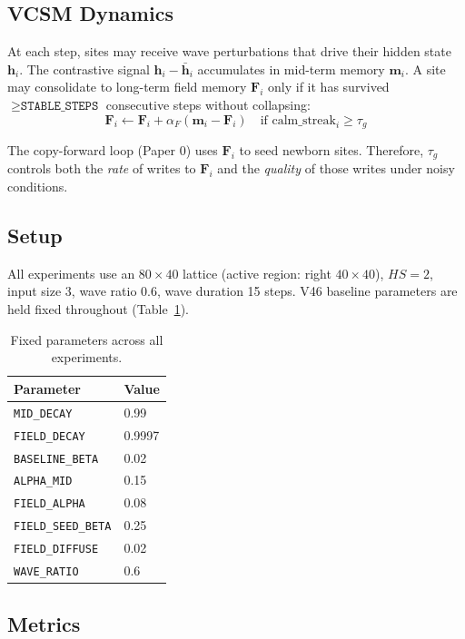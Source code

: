 \documentclass[11pt,twocolumn]{article}
\begin{document}
\subsection{VCSM Dynamics}

At each step, sites may receive wave perturbations that drive their hidden state
$\mathbf{h}_i$. The contrastive signal $\mathbf{h}_i - \bar{\mathbf{h}}_i$
accumulates in mid-term memory $\mathbf{m}_i$. A site may consolidate to
long-term field memory $\mathbf{F}_i$ only if it has survived
$\geq \texttt{STABLE\_STEPS}$ consecutive steps without collapsing:
\[
\mathbf{F}_i \leftarrow \mathbf{F}_i + \alpha_F(\mathbf{m}_i - \mathbf{F}_i)
\quad \text{if calm\_streak}_i \geq \tau_g
\]

The copy-forward loop (Paper 0) uses $\mathbf{F}_i$ to seed newborn sites.
Therefore, $\tau_g$ controls both the \emph{rate} of writes to $\mathbf{F}_i$
and the \emph{quality} of those writes under noisy conditions.

\subsection{Setup}

All experiments use an $80 \times 40$ lattice (active region: right $40 \times 40$),
$HS = 2$, input size 3, wave ratio 0.6, wave duration 15 steps.
V46 baseline parameters are held fixed throughout (Table~\ref{tab:params}).

\begin{table}[h]
\centering
\caption{Fixed parameters across all experiments.}
\label{tab:params}
\begin{tabular}{ll}
\toprule
Parameter & Value \\
\midrule
\texttt{MID\_DECAY}        & 0.99   \\
\texttt{FIELD\_DECAY}      & 0.9997 \\
\texttt{BASELINE\_BETA}    & 0.02   \\
\texttt{ALPHA\_MID}        & 0.15   \\
\texttt{FIELD\_ALPHA}      & 0.08   \\
\texttt{FIELD\_SEED\_BETA} & 0.25   \\
\texttt{FIELD\_DIFFUSE}    & 0.02   \\
\texttt{WAVE\_RATIO}       & 0.6    \\
\bottomrule
\end{tabular}
\end{table}

\subsection{Metrics}
\end{document}
